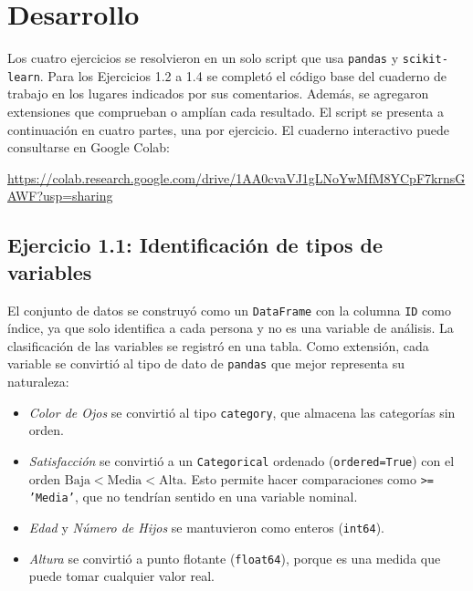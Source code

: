 \documentclass[11pt,letterpaper]{article}
\begin{document}
\section{Desarrollo}

Los cuatro ejercicios se resolvieron en un solo script que usa \texttt{pandas} y \texttt{scikit-learn}. Para los Ejercicios 1.2 a 1.4 se completó el código base del cuaderno de trabajo en los lugares indicados por sus comentarios. Además, se agregaron extensiones que comprueban o amplían cada resultado. El script se presenta a continuación en cuatro partes, una por ejercicio. El cuaderno interactivo puede consultarse en Google Colab:

\begin{center}
    \url{https://colab.research.google.com/drive/1AA0cvaVJ1gLNoYwMfM8YCpF7krnsGAWF?usp=sharing}
\end{center}

\subsection{Ejercicio 1.1: Identificación de tipos de variables}

El conjunto de datos se construyó como un \texttt{DataFrame} con la columna \texttt{ID} como índice, ya que solo identifica a cada persona y no es una variable de análisis. La clasificación de las variables se registró en una tabla. Como extensión, cada variable se convirtió al tipo de dato de \texttt{pandas} que mejor representa su naturaleza:

\begin{itemize}
    \item \textit{Color de Ojos} se convirtió al tipo \texttt{category}, que almacena las categorías sin orden.
    \item \textit{Satisfacción} se convirtió a un \texttt{Categorical} ordenado (\texttt{ordered=True}) con el orden $\text{Baja} < \text{Media} < \text{Alta}$. Esto permite hacer comparaciones como \texttt{>= 'Media'}, que no tendrían sentido en una variable nominal.
    \item \textit{Edad} y \textit{Número de Hijos} se mantuvieron como enteros (\texttt{int64}).
    \item \textit{Altura} se convirtió a punto flotante (\texttt{float64}), porque es una medida que puede tomar cualquier valor real.
\end{itemize}
\end{document}
